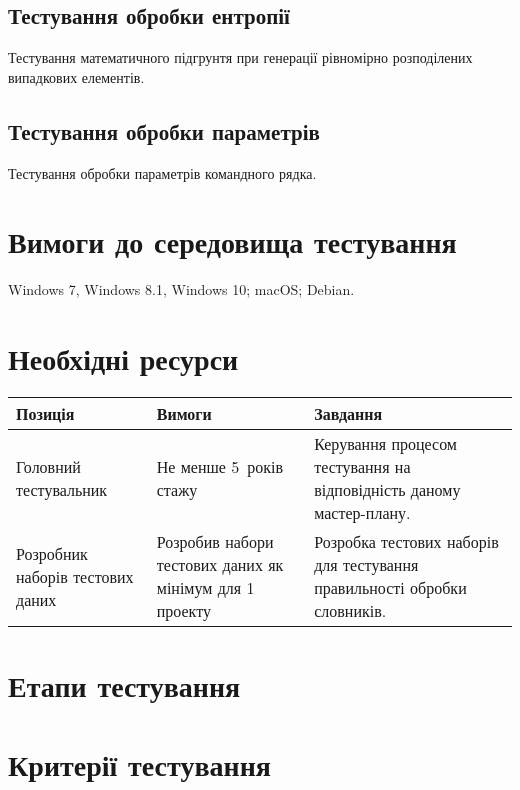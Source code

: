 \documentclass[a4paper,oneside,DIV=12,12pt]{scrartcl}
\begin{document}
			\subsection{Тестування обробки ентропії}
				Тестування математичного підгрунтя при генерації рівномірно розподілених випадкових елементів.
				
			\subsection{Тестування обробки параметрів}
				Тестування обробки параметрів командного рядка.
				
    \section{Вимоги до середовища тестування}
		\label{sec:testenvreq}
		Windows 7, Windows 8.1, Windows 10; macOS; Debian.
    \section{Необхідні ресурси}
		\label{sec:resourcesreq}
		\begin{table}[h]
			\centering
			\begin{tabular}{x{0.2\textwidth}x{0.25\textwidth}x{0.4\textwidth}}
				\toprule
				Позиція & Вимоги & Завдання \\
				\midrule
				Головний тестувальник & Не менше 5~років стажу & Керування процесом тестування на відповідність даному мастер-плану. \\
				Розробник наборів тестових даних & Розробив набори тестових даних як мінімум для 1 проекту & Розробка тестових наборів для тестування правильності обробки словників. \\
				\bottomrule
			\end{tabular}
		\end{table}
    \section{Етапи тестування}
    \section{Критерії тестування}
\end{document}
